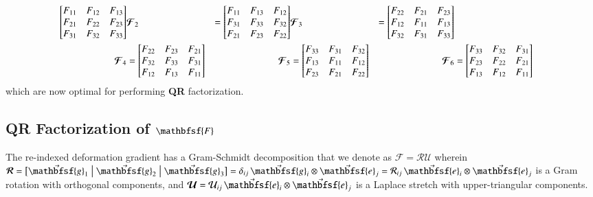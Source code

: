 \begin{subequations}
\begin{align}
\begin{bmatrix}
    F_{11} & F_{12} & F_{13}\\
    F_{21} & F_{22} & F_{23}\\
    F_{31} & F_{32} & F_{33}
    \end{bmatrix} & 
    \boldsymbol{\mathcal{F}}_2 & = \begin{bmatrix}
    F_{11} & F_{13} & F_{12}\\
    F_{31} & F_{33} & F_{32}\\
    F_{21} & F_{23} & F_{22}
    \end{bmatrix} &
    \boldsymbol{\mathcal{F}}_3 & = \begin{bmatrix}
    F_{22} & F_{21} & F_{23}\\
    F_{12} & F_{11} & F_{13}\\
    F_{32} & F_{31} & F_{33}
    \end{bmatrix} \notag \\
    \boldsymbol{\mathcal{F}}_4 & = \begin{bmatrix}
    F_{22} & F_{23} & F_{21}\\
    F_{32} & F_{33} & F_{31}\\
    F_{12} & F_{13} & F_{11}
    \end{bmatrix} &
    \boldsymbol{\mathcal{F}}_5 & = \begin{bmatrix}
    F_{33} & F_{31} & F_{32}\\
    F_{13} & F_{11} & F_{12}\\
    F_{23} & F_{21} & F_{22}
    \end{bmatrix} & 
    \boldsymbol{\mathcal{F}}_6 & = \begin{bmatrix}
    F_{33} & F_{32} & F_{31}\\
    F_{23} & F_{22} & F_{21}\\
    F_{13} & F_{12} & F_{11}
    \end{bmatrix}
    \end{align}
\end{subequations}
which are now optimal for performing \textbf{QR} factorization.

\subsection{\textbf{QR} Factorization of $\mathbfsf{F}$}

The re-indexed deformation gradient has a Gram-Schmidt decomposition that we denote as $\boldsymbol{\mathcal{F}} = \boldsymbol{\mathcal{RU}}$ wherein $\boldsymbol{\mathcal{R}} = \bigl[ \vec{\mathbfsf{g}}_1 \bigm| \vec{\mathbfsf{g}}_2 \bigm| \vec{\mathbfsf{g}}_3 \bigr] = \delta_{ij} \, \vec{\mathbfsf{g}}_i \otimes \vec{\mathbfsf{e}}_j = \mathcal{R}_{ij} \, \vec{\mathbfsf{e}}_i \otimes \vec{\mathbfsf{e}}_j$ is a Gram rotation with orthogonal components, and $\boldsymbol{\mathcal{U}} = \mathcal{U}_{ij} \, \vec{\mathbfsf{e}}_i \otimes \vec{\mathbfsf{e}}_j$ is a Laplace stretch \cite{Freedetal19} with upper-triangular components.

